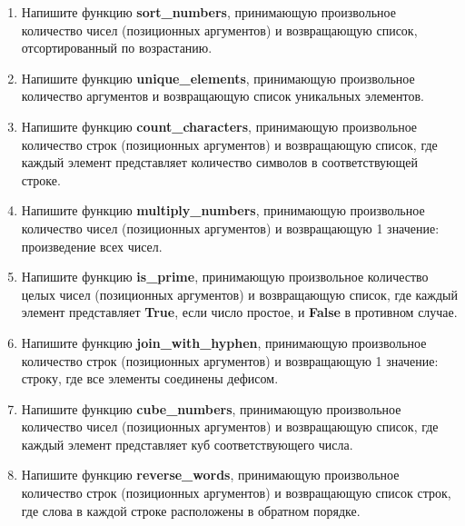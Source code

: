\documentclass[a4,12pt]{article}
\theoremstyle{remark}
\begin{document}
\begin{enumerate}
    \item Напишите функцию \textbf{sort\_numbers}, принимающую произвольное количество чисел (позиционных аргументов) и возвращающую список, отсортированный по возрастанию.
    \item Напишите функцию \textbf{unique\_elements}, принимающую произвольное количество аргументов и возвращающую список уникальных элементов.
    \item Напишите функцию \textbf{count\_characters}, принимающую произвольное количество строк (позиционных аргументов) и возвращающую список, где каждый элемент представляет количество символов в соответствующей строке.
    \item Напишите функцию \textbf{multiply\_numbers}, принимающую произвольное количество чисел (позиционных аргументов) и возвращающую 1 значение: произведение всех чисел.
    \item Напишите функцию \textbf{is\_prime}, принимающую произвольное количество целых чисел (позиционных аргументов) и возвращающую список, где каждый элемент представляет \textbf{True}, если число простое, и \textbf{False} в противном случае.
    \item Напишите функцию \textbf{join\_with\_hyphen}, принимающую произвольное количество строк (позиционных аргументов) и возвращающую 1 значение: строку, где все элементы соединены дефисом.
    \item Напишите функцию \textbf{cube\_numbers}, принимающую произвольное количество чисел (позиционных аргументов) и возвращающую список, где каждый элемент представляет куб соответствующего числа.
    \item Напишите функцию \textbf{reverse\_words}, принимающую произвольное количество строк (позиционных аргументов) и возвращающую список строк, где слова в каждой строке расположены в обратном порядке.
\end{enumerate}
\end{document}
